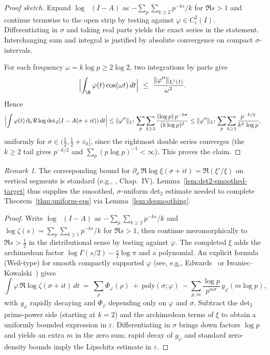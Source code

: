 \documentclass[11pt]{article}
\theoremstyle{remark}
\newtheorem{remark}[theorem]{Remark}
\DeclareMathOperator{\dettwo}{det_2}
\begin{document}
\begin{proof}[Proof sketch]
Expand \(\log\dettwo(I-A)\) as \(-\sum_{p}\sum_{k\ge2}p^{-ks}/k\) for \(\Re s>1\) and continue termwise to the open strip by testing against \(\varphi\in C_c^2(I)\). Differentiating in \(\sigma\) and taking real parts yields the exact series in the statement. Interchanging sum and integral is justified by absolute convergence on compact \(\sigma\)-intervals.

For each frequency \(\omega=k\log p\ge 2\log 2\), two integrations by parts give
\[
\Bigl|\int_{\R}\varphi(t)\cos(\omega t)\,dt\Bigr|\ \le\ \frac{\|\varphi''\|_{L^1(I)}}{\omega^2}.
\]
Hence
\[
\Bigl|\int \varphi(t)\,\partial_\sigma\Re\log\dettwo(I-A(\sigma+it))\,dt\Bigr|
\le \|\varphi''\|_{L^1}\sum_{p}\sum_{k\ge2}\frac{(\log p)\,p^{-k\sigma}}{(k\log p)^2}
\le \|\varphi''\|_{L^1}\sum_{p}\sum_{k\ge2}\frac{p^{-k/2}}{k^2\,\log p},
\]
uniformly for \(\sigma\in(\tfrac12,\tfrac12+\varepsilon_0]\), since the rightmost double series converges (the \(k\ge2\) tail gives \(p^{-k/2}\) and \(\sum_{p}(p\log p)^{-1}<\infty\)). This proves the claim.
\end{proof}

\begin{remark}
The corresponding bound for \(\partial_\sigma\,\Re\log\xi(\sigma+it)=\Re(\xi'/\xi)\) on vertical segments is standard (e.g., \cite{TitchmarshZeta}, Chap.~IV). Lemma~\ref{lem:det2-smoothed-target} thus supplies the smoothed, \(\sigma\)-uniform det$_2$ estimate needed to complete Theorem~\ref{thm:uniform-eps} via Lemma~\ref{lem:desmoothing}.
\end{remark}
\begin{proof}
Write \(\log\dettwo(I-A)\) as \(-\sum_{p}\sum_{k\ge 2} p^{-ks}/k\) and \(\log\zeta(s)=\sum_{p}\sum_{k\ge 1} p^{-ks}/k\) for \(\Re s>1\), then continue meromorphically to \(\Re s>\tfrac12\) in the distributional sense by testing against \(\varphi\). The completed \(\xi\) adds the archimedean factor \(\log\Gamma(s/2)-\tfrac{s}{2}\log\pi\) and a polynomial. An explicit formula (Weil-type) for smooth compactly supported \(\varphi\) (see, e.g., Edwards~\cite[Ch.~1, §5]{Edwards} or Iwaniec--Kowalski~\cite[Ch.~5]{IwaniecKowalski}) gives
\[
 \int \varphi\,\Re\log\zeta(\sigma+it)\,dt\ =\ \sum_{\rho} \Phi_{\varphi}(\rho)\ +\ \text{poly}(\sigma;\varphi)\ -\sum_{p,m}\frac{\log p}{p^{m\sigma}}\,g_{\varphi}(m\log p),
\]
with \(g_{\varphi}\) rapidly decaying and \(\Phi_{\varphi}\) depending only on \(\varphi\) and \(\sigma\). Subtract the det$_2$ prime-power side (starting at \(k=2\)) and the archimedean terms of \(\xi\) to obtain a uniformly bounded expression in \(\varepsilon\). Differentiating in \(\sigma\) brings down factors \(\log p\) and yields an extra \(m\) in the zero sum; rapid decay of \(g_{\varphi}\) and standard zero-density bounds imply the Lipschitz estimate in \(\varepsilon\).
\end{proof}
\end{document}
